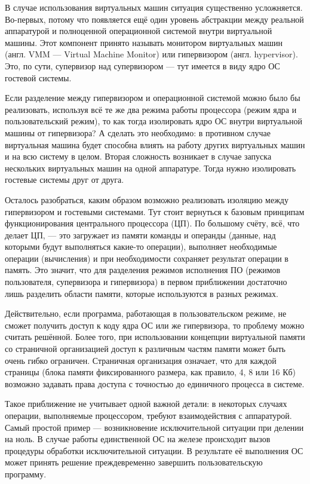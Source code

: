 \documentclass[14pt, a4paper]{article}
\begin{document}
В случае использования виртуальных машин ситуация существенно усложняется. Во-первых, потому
что появляется ещё один уровень абстракции между реальной аппаратурой и полноценной
операционной системой внутри виртуальной машины. Этот компонент принято называть монитором
виртуальных машин (англ. VMM — Virtual Machine Monitor) или гипервизором (англ. hypervisor). Это, по сути, супервизор над
супервизором — тут имеется в виду ядро ОС гостевой системы.

Если разделение между гипервизором и операционной системой можно было бы реализовать,
используя всё те же два режима работы процессора (режим ядра и пользовательский режим), то как
тогда изолировать ядро ОС внутри виртуальной машины от гипервизора? А сделать это необходимо: в
противном случае виртуальная машина будет способна влиять на работу других виртуальных машин
и на всю систему в целом. Вторая сложность возникает в случае запуска нескольких виртуальных
машин на одной аппаратуре. Тогда нужно изолировать гостевые системы друг от друга.

Осталось разобраться, каким образом возможно реализовать изоляцию между гипервизором и
гостевыми системами. Тут стоит вернуться к базовым принципам функционирования центрального
процессора (ЦП). По большому счёту, всё, что делает ЦП, — это загружает из памяти команды и
операнды (данные, над которыми будут выполняться какие-то операции), выполняет необходимые
операции (вычисления) и при необходимости сохраняет результат операции в память. Это значит, что
для разделения режимов исполнения ПО (режимов пользователя, супервизора и гипервизора) в
первом приближении достаточно лишь разделить области памяти, которые используются в разных
режимах.

Действительно, если программа, работающая в пользовательском режиме, не сможет получить
доступ к коду ядра ОС или же гипервизора, то проблему можно считать решённой. Более того, при
использовании концепции виртуальной памяти со страничной организацией доступ к различным
частям памяти может быть очень гибко ограничен. Страничная организация означает, что для каждой
страницы (блока памяти фиксированного размера, как правило, 4, 8 или 16 Кб) возможно задавать
права доступа с точностью до единичного процесса в системе.

Такое приближение не учитывает одной важной детали: в некоторых случаях операции, выполняемые
процессором, требуют взаимодействия с аппаратурой. Самый простой пример — возникновение 
исключительной ситуации при делении на ноль. В случае работы единственной ОС на железе
происходит вызов процедуры обработки исключительной ситуации. В результате её выполнения ОС
может принять решение преждевременно завершить пользовательскую программу.
\end{document}

